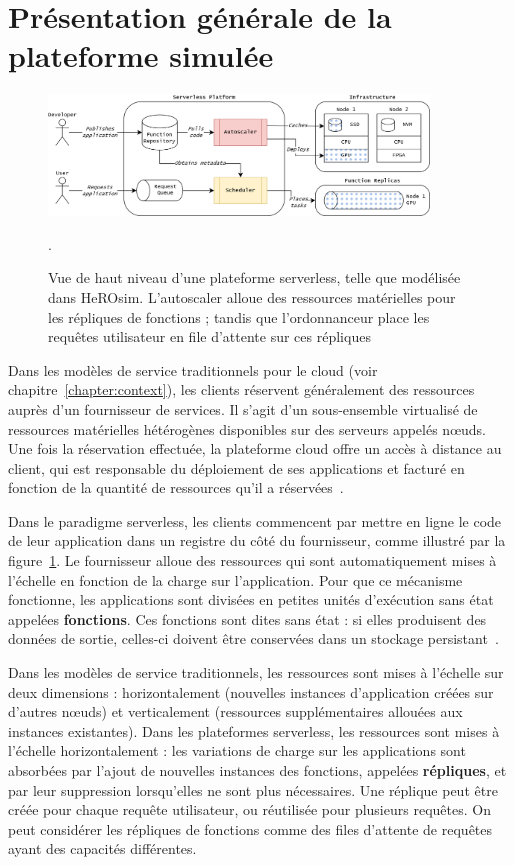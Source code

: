 \section{Présentation générale de la plateforme simulée}
\label{section:herosim-overview}

\begin{figure}[!ht]
    \centering
    \includegraphics[width=0.9\textwidth]{6_Chapitre6/figures/platform.png}
    \caption{Vue de haut niveau d'une plateforme serverless, telle que modélisée dans HeROsim. L'autoscaler alloue des ressources matérielles pour les répliques de fonctions ; tandis que l'ordonnanceur place les requêtes utilisateur en file d'attente sur ces répliques}.
\label{figure:herosim-platform}
\end{figure}

Dans les modèles de service traditionnels pour le cloud (voir chapitre~\ref{chapter:context}), les clients réservent généralement des ressources auprès d'un fournisseur de services. Il s'agit d'un sous-ensemble virtualisé de ressources matérielles hétérogènes disponibles sur des serveurs appelés nœuds. Une fois la réservation effectuée, la plateforme cloud offre un accès à distance au client, qui est responsable du déploiement de ses applications et facturé en fonction de la quantité de ressources qu'il a réservées~\cite{Lannurien2023}.

Dans le paradigme serverless, les clients commencent par mettre en ligne le code de leur application dans un registre du côté du fournisseur, comme illustré par la figure~\ref{figure:herosim-platform}. Le fournisseur alloue des ressources qui sont automatiquement mises à l'échelle en fonction de la charge sur l'application. Pour que ce mécanisme fonctionne, les applications sont divisées en petites unités d'exécution sans état appelées \textbf{fonctions}. Ces fonctions sont dites sans état : si elles produisent des données de sortie, celles-ci doivent être conservées dans un stockage persistant~\cite{yuFollowingDataNot}.

Dans les modèles de service traditionnels, les ressources sont mises à l'échelle sur deux dimensions : horizontalement (nouvelles instances d'application créées sur d'autres nœuds) et verticalement (ressources supplémentaires allouées aux instances existantes). Dans les plateformes serverless, les ressources sont mises à l'échelle horizontalement : les variations de charge sur les applications sont absorbées par l'ajout de nouvelles instances des fonctions, appelées \textbf{répliques}, et par leur suppression lorsqu'elles ne sont plus nécessaires. Une réplique peut être créée pour chaque requête utilisateur, ou réutilisée pour plusieurs requêtes. On peut considérer les répliques de fonctions comme des files d'attente de requêtes ayant des capacités différentes.

